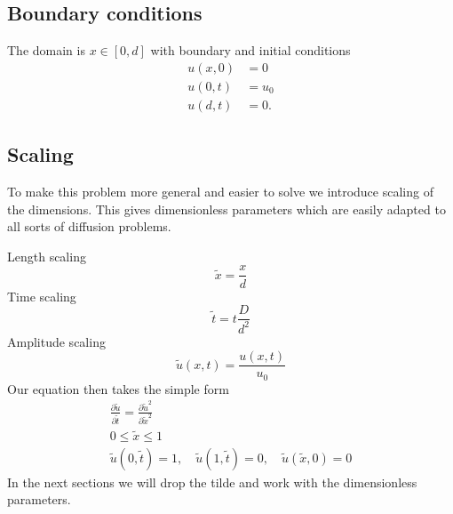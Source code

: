 \documentclass[11pt,a4paper,draft]{article}
\numberwithin{equation}{section}
\begin{document}
\subsection{Boundary conditions}
The domain is $x \in [0, d]$ with boundary and initial conditions
\begin{align}
u(x,0) &= 0\\
u(0,t) &= u_0\\
u(d,t) &= 0.
\end{align}

\subsection{Scaling}
To make this problem more general and easier to solve we introduce 
scaling of the dimensions. This gives dimensionless parameters which 
are easily adapted to all sorts of diffusion problems.

Length scaling
\begin{equation}
\tilde{x} = \frac{x}{d}
\end{equation}
Time scaling
\begin{equation}
\tilde{t} = t\frac{D}{d^2}
\end{equation}
Amplitude scaling
\begin{equation}
\tilde{u}(x,t) = \frac{u(x,t)}{u_0}
\end{equation}
Our equation then takes the simple form
\begin{gather}
\frac{\partial \tilde{u}}{\partial \tilde{t}}
= \frac{\partial \tilde{u}^2}{\partial \tilde{x}^2}\\
0 \le \tilde{x} \le 1\\
\tilde{u}(0,\tilde{t})
= 1, \quad \tilde{u}(1,\tilde{t}) = 0, \quad \tilde{u}(\tilde{x}, 0 ) = 0
\end{gather}
In the next sections we will drop the tilde and work with the 
dimensionless parameters.
\end{document}
